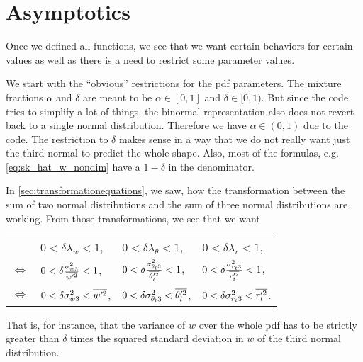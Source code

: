\chapter{Asymptotics}\label{ch:asymptotics}

Once we defined all functions,
we see that we want certain behaviors for certain values as well as
there is a need to restrict some parameter values.

We start with the \enquote{obvious} restrictions for the \gls{pdf} parameters.
The mixture fractions $\alpha$ and $\delta$ are meant to be $\alpha \in [0,1]$ and $\delta \in [0,1)$.
But since the code tries to simplify a lot of things,
the binormal representation also does not revert back to a single normal distribution.
Therefore we have $\alpha \in (0,1)$ due to the code.
The restriction to $\delta$ makes sense in a way
that we do not really want just the third normal to predict the whole shape.
Also, most of the formulas, e.g. \cref{eq:sk_hat_w_nondim} have a $1-\delta$ in the denominator.

In \cref{sec:transformationequations}, we saw,
how the transformation between the sum of two normal distributions
and the sum of three normal distributions are working.
From those transformations, we see that we want
\begin{table}[!htb]
    \centering
    \begin{tabular}{llll}
        &
        $0 < \delta\lambda_w < 1$, &
        $0 < \delta\lambda_\theta < 1$, &
        $0 < \delta\lambda_r < 1$, \\
        $\iff$ &
        $0 < \delta\frac{\sigma_{w3}^2}{\overline{w'^2}} < 1$, &
        $0 < \delta\frac{\sigma_{\theta_l 3}^2}{\overline{\theta_l'^2}} < 1$, &
        $0 < \delta\frac{\sigma_{r_t 3}^2}{\overline{r_t'^2}} < 1$, \\
        $\iff$ &
        $0 < \delta\sigma_{w3}^2 < \overline{w'^2}$, &
        $0 < \delta\sigma_{\theta_l 3}^2 < \overline{\theta_l'^2}$, &
        $0 < \delta\sigma_{r_t 3}^2 < \overline{r_t'^2}$.
    \end{tabular}
    \label{tab:table_asymp_2}
\end{table}
That is, for instance,
that the variance of $w$ over the whole \gls{pdf} has to be strictly greater than $\delta$ times
the squared standard deviation in $w$ of the third normal distribution.

